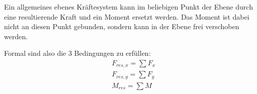 \begin{minipage}{.49\textwidth}
    \begin{infobox}
        Ein allgemeines ebenes Kräftesystem kann im beliebigen Punkt der Ebene durch eine
        resultierende Kraft und ein Moment ersetzt werden. Das Moment ist dabei nicht an diesen
        Punkt gebunden, sondern kann in der Ebene frei verschoben werden.
    \end{infobox}
\end{minipage}%
\hspace{.01\textwidth}
\begin{minipage}{.49\textwidth}
    \begin{equbox}
        Formal sind also die 3 Bedingungen zu erfüllen:
        \begin{equation}
            \begin{split}
                &F_{res, x} = \sum F_x \\
                &F_{res, y} = \sum F_y \\
                &M_{res} = \sum M
            \end{split}
        \end{equation}
    \end{equbox}
\end{minipage}


